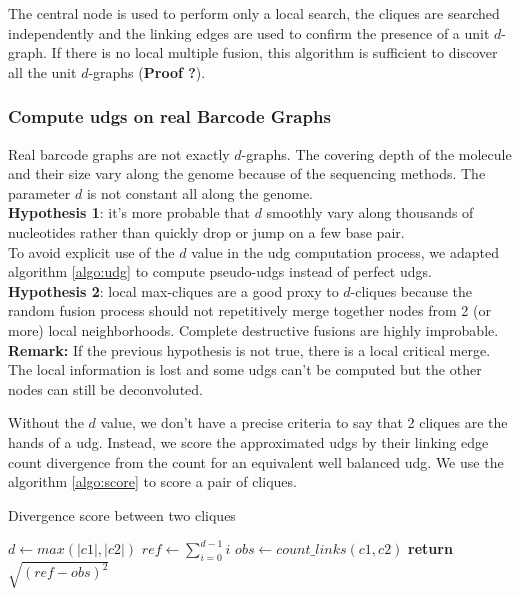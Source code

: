 \documentclass{article}
\begin{document}
The central node is used to perform only a local search, the cliques are searched independently and the linking edges are used to confirm the presence of a unit $d$-graph.
If there is no local multiple fusion, this algorithm is sufficient to discover all the unit $d$-graphs (\textbf{Proof ?}).

\subsubsection*{Compute udgs on real Barcode Graphs}

Real barcode graphs are not exactly $d$-graphs.
The covering depth of the molecule and their size vary along the genome because of the sequencing methods.
The parameter $d$ is not constant all along the genome.\\
\textbf{Hypothesis 1}: it's more probable that $d$ smoothly vary along thousands of nucleotides rather than quickly drop or jump on a few base pair.\\
To avoid explicit use of the $d$ value in the udg computation process, we adapted algorithm \ref{algo:udg} to compute pseudo-udgs instead of perfect udgs.\\
\textbf{Hypothesis 2}: local max-cliques are a good proxy to $d$-cliques because the random fusion process should not repetitively merge together nodes from 2 (or more) local neighborhoods. Complete destructive fusions are highly improbable.\\
\textbf{Remark:} If the previous hypothesis is not true, there is a local critical merge.
The local information is lost and some udgs can't be computed but the other nodes can still be deconvoluted.

Without the $d$ value, we don't have a precise criteria to say that 2 cliques are the hands of a udg.
Instead, we score the approximated udgs by their linking edge count divergence from the count for an equivalent well balanced udg.
We use the algorithm \ref{algo:score} to score a pair of cliques.

\begin{algorithm}
    \caption{Divergence score between two cliques}
    \label{algo:score}
    \begin{algorithmic}[1] %
         
            \State $d \gets max(|c1|, |c2|)$ 
            \State $ref \gets \sum_{i=0}^{d-1}i$
            \State $obs \gets count\_links(c1, c2)$
            \State \textbf{return} $\sqrt{(ref - obs)^2}$ 
        \EndProcedure
    \end{algorithmic}
\end{algorithm}
\end{document}
